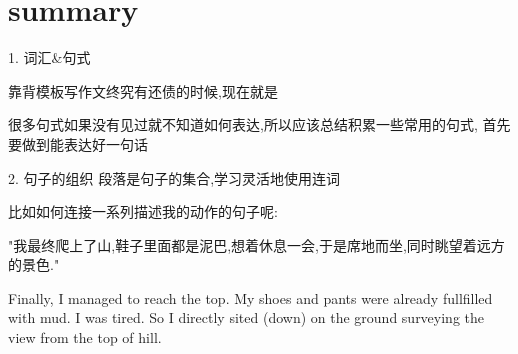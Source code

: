 \documentclass[UTF8]{article}
\begin{document}
\section{summary}
\setlength{\baselineskip}{20pt plus 1pt minus 1pt}

1. 词汇\&句式

 靠背模板写作文终究有还债的时候,现在就是

很多句式如果没有见过就不知道如何表达,所以应该总结积累一些常用的句式,
首先要做到能表达好一句话

2. 句子的组织
段落是句子的集合,学习灵活地使用连词

比如如何连接一系列描述我的动作的句子呢:

"我最终爬上了山,鞋子里面都是泥巴,想着休息一会,于是席地而坐,同时眺望着远方的景色."

Finally, I managed to reach the top. My shoes and pants were already fullfilled with mud. I was tired. So I directly  sited (down) on the ground surveying the view from the top of hill.
\end{document}
